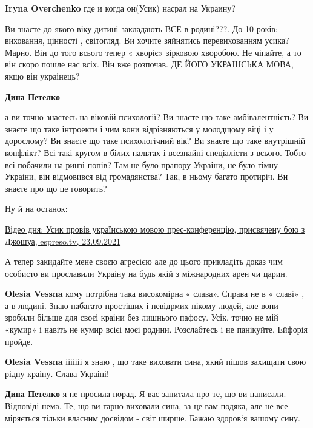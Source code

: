 \begin{itemize}
\begin{itemize}
\textbf{Iryna Overchenko} где и когда он(Усик) насрал на Украину?
\end{itemize} %


Ви знаєте до якого віку дитині закладають ВСЕ в родині???. До 10 років:
виховання, цінності , світогляд. Ви хочите зяйнятись перевихованням усика?
Марно. Він до того всього тепер « хворіє» зірковою хворобою. Не чіпайте, а то
він скоро пошле нас всіх. Він вже розпочав. ДЕ ЙОГО УКРАІНСЬКА МОВА, якщо він
украінець?

\begin{itemize} %
\textbf{Дина Петелко} 

а ви точно знаєтесь на віковій психології? Ви знаєте що таке амбівалентність?
Ви знаєте що таке інтроекти і чим вони відрізняються у молодщому віці і у
дорослому? Ви знаєте що таке психологічний вік? Ви знаєте що таке внутрішній
конфлікт? Всі такі кругом в білих пальтах і всезнайні спеціалісти з всього.
Тобто всі побачили на ринзі попів? Там не було прапору Украіни, не було гімну
Украіни, він відмовився від громадянства? Так, в ньому багато протиріч. Ви
знаєте про що це говорить?

Ну й на останок:

\href{https://espreso.tv/video-dnya-usik-proviv-ukrainskoyu-movoyu-pres-konferentsiyu-prisvyachenu-boyu-z-dzhoshua}{%
Відео дня: Усик провів українською мовою прес-конференцію, присвячену бою з Джошуа, espreso.tv, 23.09.2021%
}

А тепер закидайте мене своєю агресією але до цього прикладіть доказ чим
особисто ви прославили Украіну на будь якій з міжнародних арен чи царин.

\textbf{Olesia Vessna} кому потрібна така високомірна « слава». Справа не в « славі» , а в людині. Знаю набагато простіших і невідрмих нікому людей, але вони зробили більше для своєі краіни без лишнього пафосу. Усік, точно не мій «кумир» і навіть не кумир всієі моєі родини. Розслабтесь і не панікуйте. Ейфорія пройде.

\textbf{Olesia Vessna} ііііііі я знаю , що таке виховати сина, який пішов захищати свою рідну краіну. Слава Украіні!

\textbf{Дина Петелко} я не просила порад. Я вас запитала про те, що ви написали. Відповіді нема. Те, що ви гарно виховали сина, за це вам подяка, але не все міряється тільки власним досвідом - світ ширше. Бажаю здоров‘я вашому сину.


\end{itemize}
\end{itemize}
